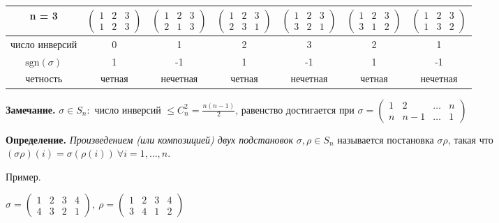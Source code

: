 \begin{table}[!ht]
		\begin{tabular}{c|c|c|c|c|c|c}
    	n = 3 & $\begin{pmatrix} 1 & 2 & 3 \\ 1 & 2 & 3 \end{pmatrix}$ & $\begin{pmatrix} 1 & 2 & 3 \\ 2 & 1 & 3 \end{pmatrix}$ & $\begin{pmatrix} 1 & 2 & 3 \\ 2 & 3 & 1 \end{pmatrix}$ & $\begin{pmatrix} 1 & 2 & 3 \\ 3 & 2 & 1 \end{pmatrix}$ & $\begin{pmatrix} 1 & 2 & 3 \\ 3 & 1 & 2 \end{pmatrix}$ & $\begin{pmatrix} 1 & 2 & 3 \\ 1 & 3 & 2 \end{pmatrix}$ \\
        \hline
       число инверсий & 0 & 1 & 2 & 3 & 2 & 1\\
       \hline
          $\mathrm{sgn} (\sigma)$ & 1 & -1 & 1 & -1 & 1 & -1 \\
          \hline
        четность & четная & нечетная & четная & нечетная & четная & нечетная
		\end{tabular}
\end{table}

\textbf{Замечание.} $\sigma \in S_n :$ число инверсий $\leq C_n^2 = \frac{n(n-1)}{2}$, равенство достигается при $\sigma = \begin{pmatrix} 1 & 2 & \dots & n \\ n & n-1 & \dots & 1 \end{pmatrix}$

\bigskip
\textbf{Определение.} \textit{Произведением (или композицией) двух подстановок} $\sigma, \rho \in S_n$ называется постановка $\sigma \rho$, такая что $(\sigma \rho)(i) = \sigma (\rho (i)) \ \forall i=1, \dots, n$.

\bigskip
Пример.

$\sigma = \begin{pmatrix} 1 & 2 & 3 & 4 \\ 4 & 3 & 2 & 1 \end{pmatrix},\ \rho = \begin{pmatrix} 1 & 2 & 3 & 4 \\ 3 & 4 & 1 & 2 \end{pmatrix}$


